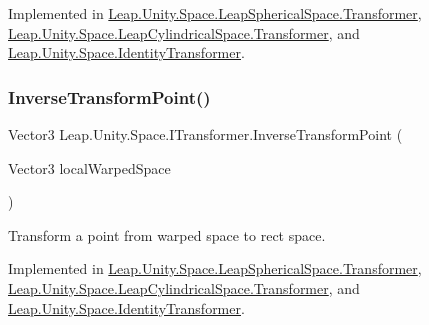 Implemented in \mbox{\hyperlink{class_leap_1_1_unity_1_1_space_1_1_leap_spherical_space_1_1_transformer_ac82a933f2e7851ccc455b11dd789dd87}{Leap.\+Unity.\+Space.\+Leap\+Spherical\+Space.\+Transformer}}, \mbox{\hyperlink{class_leap_1_1_unity_1_1_space_1_1_leap_cylindrical_space_1_1_transformer_ab494977cfba432d2af0103dbe9a004dd}{Leap.\+Unity.\+Space.\+Leap\+Cylindrical\+Space.\+Transformer}}, and \mbox{\hyperlink{class_leap_1_1_unity_1_1_space_1_1_identity_transformer_a793967a882ba3156bf728ca4ad8afd26}{Leap.\+Unity.\+Space.\+Identity\+Transformer}}.

\mbox{\label{interface_leap_1_1_unity_1_1_space_1_1_i_transformer_ad919653073748169561e99cace4f5931}} 
\subsubsection{\texorpdfstring{InverseTransformPoint()}{InverseTransformPoint()}}
{\footnotesize\ttfamily Vector3 Leap.\+Unity.\+Space.\+I\+Transformer.\+Inverse\+Transform\+Point (\begin{DoxyParamCaption}\item[{Vector3}]{local\+Warped\+Space }\end{DoxyParamCaption})}



Transform a point from warped space to rect space. 



Implemented in \mbox{\hyperlink{class_leap_1_1_unity_1_1_space_1_1_leap_spherical_space_1_1_transformer_acd09436f553794da5536559b5c3bfcab}{Leap.\+Unity.\+Space.\+Leap\+Spherical\+Space.\+Transformer}}, \mbox{\hyperlink{class_leap_1_1_unity_1_1_space_1_1_leap_cylindrical_space_1_1_transformer_a4005272b32cd3040a830f43ad9e072d9}{Leap.\+Unity.\+Space.\+Leap\+Cylindrical\+Space.\+Transformer}}, and \mbox{\hyperlink{class_leap_1_1_unity_1_1_space_1_1_identity_transformer_a404c960dbb06676aee1e634957349e4b}{Leap.\+Unity.\+Space.\+Identity\+Transformer}}.

\mbox{\label{interface_leap_1_1_unity_1_1_space_1_1_i_transformer_abfcf877e117b7f70b2ce60259b88c459}} 
